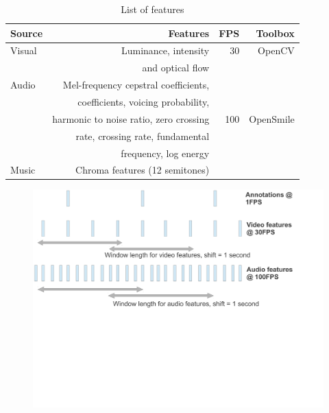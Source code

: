 \documentclass{article}
\begin{document}
\begin{table}[t]
\centering
\begin{tabular}{|@{}l@{}|r|r|r@{}|}
\hline
{\bf Source} &{\bf Features} & {\bf FPS} & {\bf Toolbox} \\ \hline
Visual & Luminance, intensity & 30 & OpenCV \\ 
       & and optical flow & & \cite{} \\ \hline
Audio & Mel-frequency cepstral coefficients,& & \\
               & coefficients, voicing probability, & & \\  
               & harmonic to noise ratio, zero crossing & 100 & OpenSmile \\  
               & rate, crossing rate, fundamental & &\cite{} \\  
               & frequency, log energy & & \\ \cline{1-2}
Music & Chroma features (12 semitones) & & \\ \hline
\end{tabular}
\caption{List of features}
\label{table:features}
\end{table}


\begin{figure}[t]
\centering
\includegraphics [trim=0cm 9cm 3cm 0cm,clip=true,scale=.355] {images/features_fig.pdf} 
\caption{}
\label{back_fig}
\end{figure}
\end{document}
